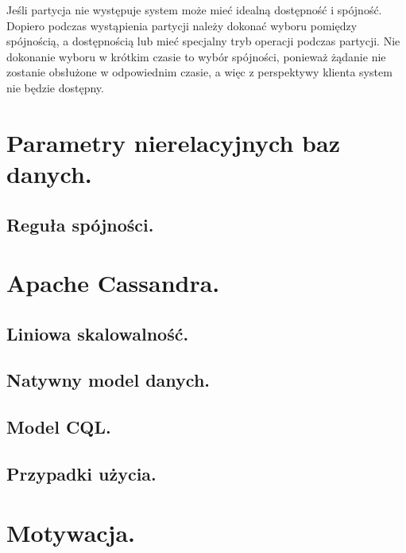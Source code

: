 \documentclass[oneside, 11pt, a4paper]{article}
\begin{document}
\begin{multicols}{2}
Jeśli partycja nie występuje system może mieć idealną dostępność i spójność. Dopiero podczas wystąpienia partycji należy dokonać wyboru pomiędzy spójnością, a dostępnością lub mieć specjalny tryb operacji podczas partycji. Nie dokonanie wyboru w krótkim czasie to wybór spójności, ponieważ żądanie nie zostanie obsłużone w odpowiednim czasie, a więc z perspektywy klienta system nie będzie dostępny.

\section{Parametry nierelacyjnych baz danych.}

\subsection{Reguła spójności.}

\section{Apache Cassandra.}

\subsection{Liniowa skalowalność.}

\subsection{Natywny model danych.}

\subsection{Model CQL.}

\subsection{Przypadki użycia.}

\section{Motywacja.}



\end{multicols}
\end{document}
